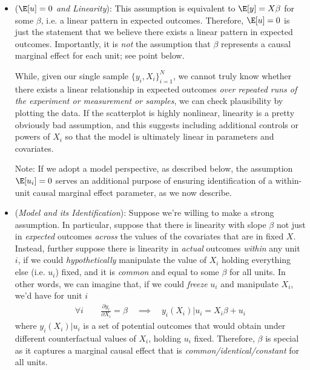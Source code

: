 \documentclass[12pt]{article}
\theoremstyle{plain}
\theoremstyle{definition}
\theoremstyle{remark}
\begin{document}
\begin{itemize}
  \item (\emph{$\E[u]=0$ and Linearity}):
    This assumption is equivalent to $\E[y]=X\beta$ for some $\beta$,
    i.e. a linear pattern in expected outcomes.
    Therefore, $\E[u]=0$ is just the statement that we believe there
    exists a linear pattern in expected outcomes.
    Importantly, it is \emph{not} the assumption that $\beta$ represents
    a causal marginal effect for each unit; see point below.

    While, given our single sample $\{y_i,X_i\}_{i=1}^N$, we cannot truly
    know whether there exists a linear relationship in expected outcomes
    \emph{over repeated runs of the experiment or measurement or samples},
    we can check plausibility by plotting the data.
    If the scatterplot is highly nonlinear, linearity is a pretty
    obviously bad assumption, and this suggests including additional
    controls or powers of $X_i$ so that the model is ultimately linear
    in parameters and covariates.

    Note: If we adopt a model perspective, as described below, the
    assumption $\E[u_i]=0$ serves an additional purpose of ensuring
    identification of a within-unit causal marginal effect parameter, as
    we now describe.

  \item
    (\emph{Model and its Identification}):
    Suppose we're willing to make a strong assumption.
    In particular, suppose that there is linearity with slope $\beta$
    not just in \emph{expected} outcomes \emph{across} the values of the
    covariates that are in fixed $X$.
    Instead, further suppose there is linearity in \emph{actual}
    outcomes \emph{within} any unit $i$, if we could
    \emph{hypothetically} manipulate the value of $X_i$ holding
    everything else (i.e. $u_i$) fixed, and it is \emph{common} and
    equal to some $\beta$ for all units.
    In other words, we can imagine that, if we could \emph{freeze} $u_i$
    and manipulate $X_i$, we'd have for unit $i$
    \begin{align*}
      \forall i\qquad
      \frac{\partial y_i}{\partial X_i}
      =
      \beta
      \quad\implies\quad
      y_i(X_i) | u_i = X_i\beta + u_i
    \end{align*}
    where $y_i(X_i)|u_i$ is a set of potential outcomes that would
    obtain under different counterfactual values of $X_i$, holding $u_i$
    fixed.
    Therefore,
    $\beta$ is special as it captures a marginal causal effect
    that is \emph{common/identical/constant} for all units.


\end{itemize}
\end{document}
